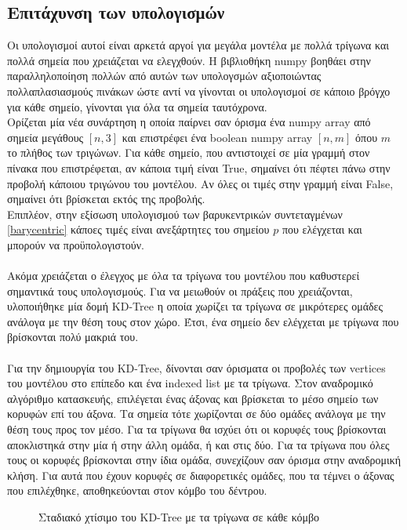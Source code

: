 \documentclass{report}
\begin{document}
\subsection{Επιτάχυνση των υπολογισμών}
Οι υπολογισμοί αυτοί είναι αρκετά αργοί για μεγάλα μοντέλα με πολλά τρίγωνα και πολλά σημεία που χρειάζεται να ελεγχθούν.
Η βιβλιοθήκη numpy βοηθάει στην παραλληλοποίηση πολλών από αυτών των υπολογσμών αξιοποιώντας πολλαπλασιασμούς πινάκων ώστε
αντί να γίνονται οι υπολογισμοί σε κάποιο βρόγχο για κάθε σημείο, γίνονται για όλα τα σημεία ταυτόχρονα.\\
Ορίζεται μία νέα συνάρτηση η οποία παίρνει σαν όρισμα ένα numpy array από σημεία μεγάθους $\left[n, 3\right]$ και επιστρέφει
ένα boolean numpy array $\left[n, m\right]$ όπου $m$ το πλήθος των τριγώνων. Για κάθε σημείο, που αντιστοιχεί σε μία γραμμή στον πίνακα
που επιστρέφεται, αν κάποια τιμή είναι True, σημαίνει ότι πέφτει πάνω στην προβολή κάποιου τριγώνου του μοντέλου. Αν όλες οι τιμές στην γραμμή
είναι False, σημαίνει ότι βρίσκεται εκτός της προβολής.
\\
Επιπλέον, στην εξίσωση υπολογισμού των βαρυκεντρικών συντεταγμένων \eqref{barycentric} κάποες τιμές είναι ανεξάρτητες
του σημείου $p$ που ελέγχεται και μπορούν να προϋπολογιστούν.
\\\\
Ακόμα χρειάζεται ο έλεγχος με όλα τα τρίγωνα του μοντέλου που καθυστερεί σημαντικά τους υπολογισμούς. Για να μειωθούν οι πράξεις που
χρειάζονται, υλοποιήθηκε μία δομή KD-Tree η οποία χωρίζει τα τρίγωνα σε μικρότερες ομάδες ανάλογα με την θέση τους στον χώρο. Έτσι, ένα
σημείο δεν ελέγχεται με τρίγωνα που βρίσκονται πολύ μακριά του.
\\\\
Για την δημιουργία του KD-Tree, δίνονται σαν όρισματα οι προβολές των vertices του μοντέλου στο επίπεδο και ένα indexed list
με τα τρίγωνα. Στον αναδρομικό αλγόριθμο κατασκευής, επιλέγεται ένας άξονας και βρίσκεται το μέσο σημείο των κορυφών επί του άξονα.
Τα σημεία τότε χωρίζονται σε δύο ομάδες ανάλογα με την θέση τους προς τον μέσο. Για τα τρίγωνα θα ισχύει ότι οι κορυφές τους βρίσκονται
αποκλιστηκά στην μία ή στην άλλη ομάδα, ή και στις δύο. Για τα τρίγωνα που όλες τους οι κορυφές βρίσκονται στην ίδια ομάδα, συνεχίζουν
σαν όρισμα στην αναδρομική κλήση. Για αυτά που έχουν κορυφές σε διαφορετικές ομάδες, που τα τέμνει ο άξονας που επιλέχθηκε, αποθηκεύονται
στον κόμβο του δέντρου.


\begin{figure}[H]
    \centering
    \captionsetup{font=small}
    \captionsetup{font=normal}
    \caption{Σταδιακό χτίσιμο του KD-Tree με τα τρίγωνα σε κάθε κόμβο}
\end{figure}
\end{document}
